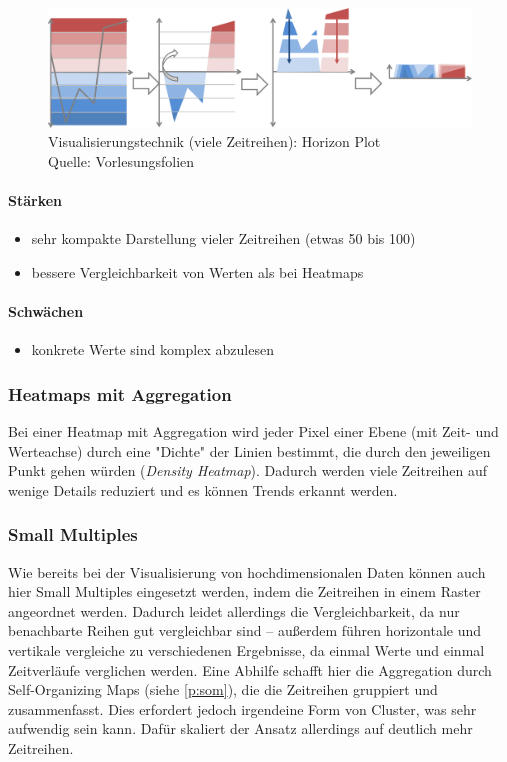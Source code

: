 				\begin{figure}
					\centering
					\includegraphics[width=\linewidth]{horizonplot}
					\caption[Visualisierungstechnik (viele Zeitreihen): Horizon Plot]{Visualisierungstechnik (viele Zeitreihen): Horizon Plot\\Quelle: Vorlesungsfolien}
					\label{fig:horizonplot}
				\end{figure}

				\paragraph{Stärken}
				\begin{itemize}
					\item sehr kompakte Darstellung vieler Zeitreihen (etwas 50 bis 100)
					\item bessere Vergleichbarkeit von Werten als bei Heatmaps
				\end{itemize}

				\paragraph{Schwächen}
				\begin{itemize}
					\item konkrete Werte sind komplex abzulesen
				\end{itemize}

			\subsubsection{Heatmaps mit Aggregation}
				Bei einer Heatmap mit Aggregation wird jeder Pixel einer Ebene (mit Zeit- und Werteachse) durch eine "Dichte" der Linien bestimmt, die durch den jeweiligen Punkt gehen würden (\emph{Density Heatmap}). Dadurch werden viele Zeitreihen auf wenige Details reduziert und es können Trends erkannt werden.

			\subsubsection{Small Multiples}
				Wie bereits bei der Visualisierung von hochdimensionalen Daten können auch hier Small Multiples eingesetzt werden, indem die Zeitreihen in einem Raster angeordnet werden. Dadurch leidet allerdings die Vergleichbarkeit, da nur benachbarte Reihen gut vergleichbar sind -- außerdem führen horizontale und vertikale vergleiche zu verschiedenen Ergebnisse, da einmal Werte und einmal Zeitverläufe verglichen werden. Eine Abhilfe schafft hier die Aggregation durch Self-Organizing Maps (siehe \autoref{p:som}), die die Zeitreihen gruppiert und zusammenfasst. Dies erfordert jedoch irgendeine Form von Cluster, was sehr aufwendig sein kann. Dafür skaliert der Ansatz allerdings auf deutlich mehr Zeitreihen.

